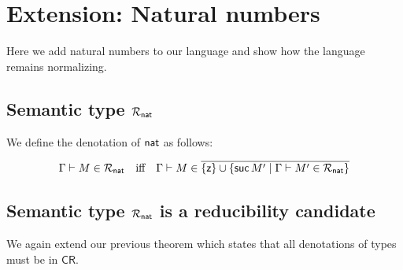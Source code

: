 \documentclass{article}
\newcommand{\CR}{\textsf{CR}}
\newcommand{\denot}[1]{\mathcal{R}_{#1}}
\newcommand{\inden}[3]{#1 \vdash #2 \in \denot{#3}}
\newcommand{\clos}[1]{\overline{#1}}
\def\lv{\mathopen{{[\kern-0.14em[}}}    %
\def\rv{\mathclose{{]\kern-0.14em]}}}   %
\newcommand{\den}[1]{\lv #1 \rv}
\begin{document}
 \section{Extension: Natural numbers}
Here we add natural numbers to our language and show how the language remains normalizing.
\subsection{Semantic type $\denot{\nat}$} We define the denotation of $\mathsf{nat}$ as
 follows:


	\[
	\begin{array}{lcl}
	\inden{\Gamma}{M}{\nat} & \text{iff} & \Gamma \vdash M \in \clos{ \{\zero\}\cup \{\suc M' \mid \inden{\Gamma}{M'}{\nat}\} }
	\end{array}
	\]


\subsection{Semantic type $\denot{\nat}$ is a reducibility candidate}
We again extend our previous theorem which states that all denotations of types must be in $\CR$.
\end{document}
